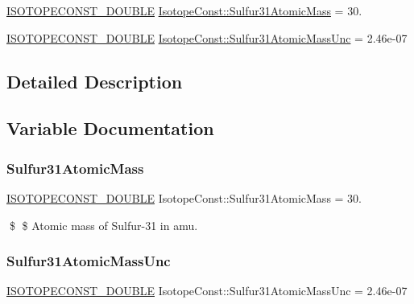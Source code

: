 \begin{DoxyCompactItemize}
\item 
\mbox{\hyperlink{group___isotope_const-_macros_ga8f45a7272ce02c0b4c65c44636ed719a}{I\+S\+O\+T\+O\+P\+E\+C\+O\+N\+S\+T\+\_\+\+D\+O\+U\+B\+LE}} \mbox{\hyperlink{group___isotope_const-_sulfur-_s31_gaf3625ed3003a6767e796a79c5f5903aa}{Isotope\+Const\+::\+Sulfur31\+Atomic\+Mass}} = 30.
\item 
\mbox{\hyperlink{group___isotope_const-_macros_ga8f45a7272ce02c0b4c65c44636ed719a}{I\+S\+O\+T\+O\+P\+E\+C\+O\+N\+S\+T\+\_\+\+D\+O\+U\+B\+LE}} \mbox{\hyperlink{group___isotope_const-_sulfur-_s31_ga60768ad9d03c6cd1ede78a25e5cdfb03}{Isotope\+Const\+::\+Sulfur31\+Atomic\+Mass\+Unc}} = 2.\+46e-\/07
\end{DoxyCompactItemize}


\subsection{Detailed Description}


\subsection{Variable Documentation}
\mbox{\label{group___isotope_const-_sulfur-_s31_gaf3625ed3003a6767e796a79c5f5903aa}} 
\subsubsection{\texorpdfstring{Sulfur31\+Atomic\+Mass}{Sulfur31AtomicMass}}
{\footnotesize\ttfamily \mbox{\hyperlink{group___isotope_const-_macros_ga8f45a7272ce02c0b4c65c44636ed719a}{I\+S\+O\+T\+O\+P\+E\+C\+O\+N\+S\+T\+\_\+\+D\+O\+U\+B\+LE}} Isotope\+Const\+::\+Sulfur31\+Atomic\+Mass = 30.}

\$ \$ Atomic mass of Sulfur-\/31 in amu. \mbox{\label{group___isotope_const-_sulfur-_s31_ga60768ad9d03c6cd1ede78a25e5cdfb03}} 
\subsubsection{\texorpdfstring{Sulfur31\+Atomic\+Mass\+Unc}{Sulfur31AtomicMassUnc}}
{\footnotesize\ttfamily \mbox{\hyperlink{group___isotope_const-_macros_ga8f45a7272ce02c0b4c65c44636ed719a}{I\+S\+O\+T\+O\+P\+E\+C\+O\+N\+S\+T\+\_\+\+D\+O\+U\+B\+LE}} Isotope\+Const\+::\+Sulfur31\+Atomic\+Mass\+Unc = 2.\+46e-\/07}

